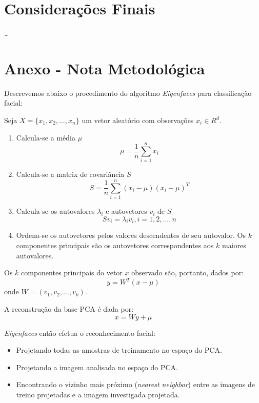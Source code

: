 \documentclass[a4paper, 12pt, openright, oneside, english, brazil, article]{abntex2}
\begin{document}
	\section*{Considerações Finais}
	
	\ldots
	
	
	\newpage
	\postextual
	\anexos
	\section*{Anexo - Nota Metodológica}
	Descrevemos abaixo o procedimento do algoritmo \textit{Eigenfaces} para classificação facial:
	
	Seja $X = \{x_1, x_2, \ldots, x_n\}$ um vetor aleatório com observações $x_i \in R^d$.
	
	\begin{enumerate}
		\item Calcula-se a média $\mu$
		$$\mu = \frac{1}{n} \sum_{i=1}^{n}x_i$$
		
		\item Calcula-se a matrix de covariância $S$
		$$S = \frac{1}{n} \sum_{i=1}^{n}(x_i - \mu)(x_i - \mu)^T$$
		
		\item Calcula-se os autovalores $\lambda_i$ e autovetores $v_i$ de $S$
		$$Sv_i = \lambda_iv_i, i=1,2,\ldots,n$$
		
		\item Ordena-se os autovetores pelos valores descendentes de seu autovalor. Os $k$ componentes principais são os autovetores correspondentes aos $k$ maiores autovalores.		
	\end{enumerate}

	Os $k$ componentes principais do vetor $x$ observado são, portanto, dados por:
	$$y = W^T(x-\mu)$$
	onde $W = (v_1, v_2, \ldots, v_k)$. 
	
	A reconstrução da base PCA é dada por:
	$$x = Wy + \mu$$

	\textit{Eigenfaces} então efetua o reconhecimento facial:
	\begin{itemize}
		\item Projetando todas as amostras de treinamento no espaço do PCA.
		\item Projetando a imagem analisada no espaço do PCA.
		\item Encontrando o vizinho mais próximo (\textit{nearest neighbor}) entre as imagens de treino projetadas e a imagem investigada projetada.
	\end{itemize}

	
	
\end{document}

